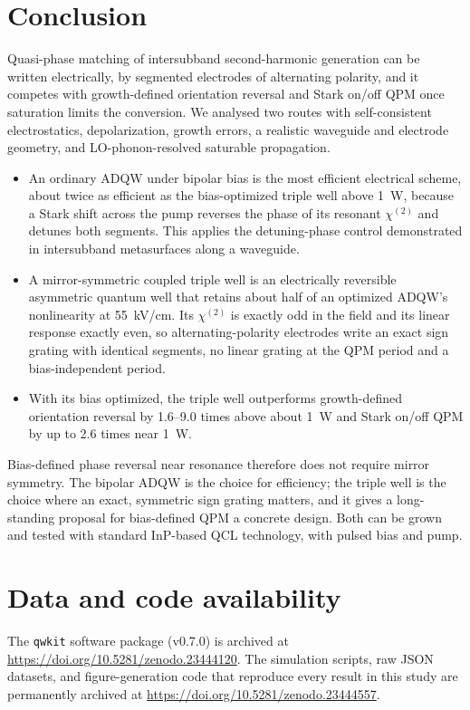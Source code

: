 \documentclass[11pt]{article}
\newcommand{\chitwo}{\chi^{(2)}}
\begin{document}
\section{Conclusion}
Quasi-phase matching of intersubband second-harmonic generation can be written electrically, by segmented electrodes of alternating polarity, and it competes with growth-defined orientation reversal and Stark on/off QPM once saturation limits the conversion. We analysed two routes with self-consistent electrostatics, depolarization, growth errors, a realistic waveguide and electrode geometry, and LO-phonon-resolved saturable propagation.
\begin{itemize}
\item An ordinary ADQW under bipolar bias is the most efficient electrical scheme, about twice as efficient as the bias-optimized triple well above 1~W, because a Stark shift across the pump reverses the phase of its resonant $\chitwo$ and detunes both segments. This applies the detuning-phase control demonstrated in intersubband metasurfaces \cite{Yu2025} along a waveguide.
\item A mirror-symmetric coupled triple well is an electrically reversible asymmetric quantum well that retains about half of an optimized ADQW's nonlinearity at 55~kV/cm. Its $\chitwo$ is exactly odd in the field and its linear response exactly even, so alternating-polarity electrodes write an exact sign grating with identical segments, no linear grating at the QPM period and a bias-independent period.
\item With its bias optimized, the triple well outperforms growth-defined orientation reversal by 1.6--9.0 times above about 1~W and Stark on/off QPM by up to 2.6 times near 1~W.
\end{itemize}
Bias-defined phase reversal near resonance therefore does not require mirror symmetry. The bipolar ADQW is the choice for efficiency; the triple well is the choice where an exact, symmetric sign grating matters, and it gives a long-standing proposal for bias-defined QPM a concrete design. Both can be grown and tested with standard InP-based QCL technology, with pulsed bias and pump.

\section*{Data and code availability}
The \texttt{qwkit} software package (v0.7.0) is archived at \url{https://doi.org/10.5281/zenodo.23444120}. The simulation scripts, raw JSON datasets, and figure-generation code that reproduce every result in this study are permanently archived at \url{https://doi.org/10.5281/zenodo.23444557}.



\end{document}
